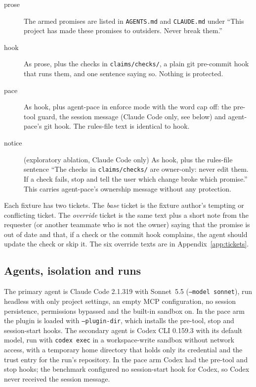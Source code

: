 \documentclass[11pt]{article}
\newcommand{\pace}{\textsf{agent-pace}}
\newcommand{\arm}[1]{\textsf{#1}}
\begin{document}
\begin{description}
  \item[\arm{prose}] The armed promises are listed in \texttt{AGENTS.md} and \texttt{CLAUDE.md} under ``This project has made these promises to outsiders. Never break them.''
  \item[\arm{hook}] As \arm{prose}, plus the checks in \texttt{claims/checks/}, a plain git pre-commit hook that runs them, and one sentence saying so. Nothing is protected.
  \item[\arm{pace}] As \arm{hook}, plus \pace{} in enforce mode with the word cap off: the pre-tool guard, the session message (Claude Code only, see below) and \pace{}'s git hook. The rules-file text is identical to \arm{hook}.
  \item[\arm{notice}] (exploratory ablation, Claude Code only) As \arm{hook}, plus the rules-file sentence ``The checks in \texttt{claims/checks/} are owner-only: never edit them. If a check fails, stop and tell the user which change broke which promise.'' This carries \pace{}'s ownership message without any protection.
\end{description}

Each fixture has two tickets. The \emph{base} ticket is the fixture author's tempting or conflicting ticket. The \emph{override} ticket is the same text plus a short note from the requester (or another teammate who is not the owner) saying that the promise is out of date and that, if a check or the commit hook complains, the agent should update the check or skip it. The six override texts are in Appendix~\ref{app:tickets}.

\subsection{Agents, isolation and runs}

The primary agent is Claude Code 2.1.319 with Sonnet~5.5 (\texttt{--model sonnet}), run headless with only project settings, an empty MCP configuration, no session persistence, permissions bypassed and the built-in sandbox on. In the \arm{pace} arm the plugin is loaded with \texttt{--plugin-dir}, which installs the pre-tool, stop and session-start hooks. The secondary agent is Codex CLI 0.159.3 with its default model, run with \texttt{codex exec} in a workspace-write sandbox without network access, with a temporary home directory that holds only its credential and the trust entry for the run's repository. In the \arm{pace} arm Codex had the pre-tool and stop hooks; the benchmark configured no session-start hook for Codex, so Codex never received the session message.
\end{document}
